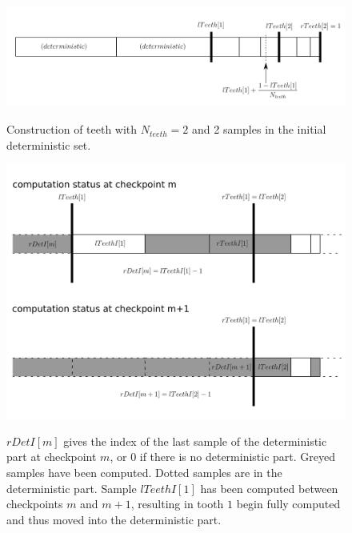 \documentclass[./thesis.tex]{subfiles}
\begin{document}
\begin{figure}[h!]
	\begin{center}
		\includegraphics[width=1.00\columnwidth]{figures/pt2/teeths}
		\caption{\label{filtering}}
		Construction of teeth with $N_{teeth} = 2$ and 2 samples in the initial deterministic set.
	\end{center}
\end{figure}

\begin{figure}[h!]
	\begin{center}
		\includegraphics[width=1.00\columnwidth]{figures/matrix_dressing/deterministic_cp}
		\caption{\label{filtering}}
		$rDetI[m]$ gives the index of the last sample of the deterministic part at checkpoint $m$, or $0$ if there is no deterministic part.
		Greyed samples have been computed. Dotted samples are in the deterministic part. Sample $lTeethI[1]$ has been computed between checkpoints $m$ and $m+1$, resulting in tooth $1$ begin fully computed and thus moved into the deterministic part.
	\end{center}
\end{figure}
\end{document}
